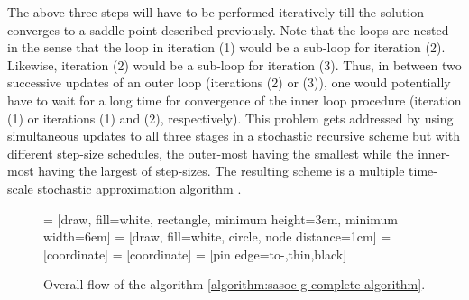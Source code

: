 \documentclass[11pt,letterpaper,english]{article}
\begin{document}
The above three steps will have to be performed iteratively till the
solution converges to a saddle point described previously.
Note that the loops are nested in the sense that the loop in iteration (1) would be a sub-loop for iteration (2). Likewise, iteration (2) would be a sub-loop for iteration (3). Thus, in between two successive updates of an outer loop (iterations (2) or (3)), one would potentially have to wait for a long time for convergence of the inner loop procedure (iteration (1) or iterations (1) and (2), respectively). This problem gets addressed by using
simultaneous updates to all three stages in a stochastic recursive
scheme but with different step-size schedules, the outer-most having
the smallest while the inner-most having the largest of step-sizes. The
resulting scheme is a multiple time-scale stochastic approximation
algorithm \citep[Chapter 6]{borkar2008stochastic}.






\begin{figure}
\begin{minipage}[c][\textheight]{\textwidth}
\centering
{} = [draw, fill=white, rectangle,
    minimum height=3em, minimum width=6em]
 = [draw, fill=white, circle, node distance=1cm]
 = [coordinate]
 = [coordinate]
 = [pin edge={to-,thin,black}]
\caption{Overall flow of the algorithm \ref{algorithm:sasoc-g-complete-algorithm}.}
\label{fig:sasoc-g-algorithm-flow}
\end{minipage}
\end{figure}
\end{document}
